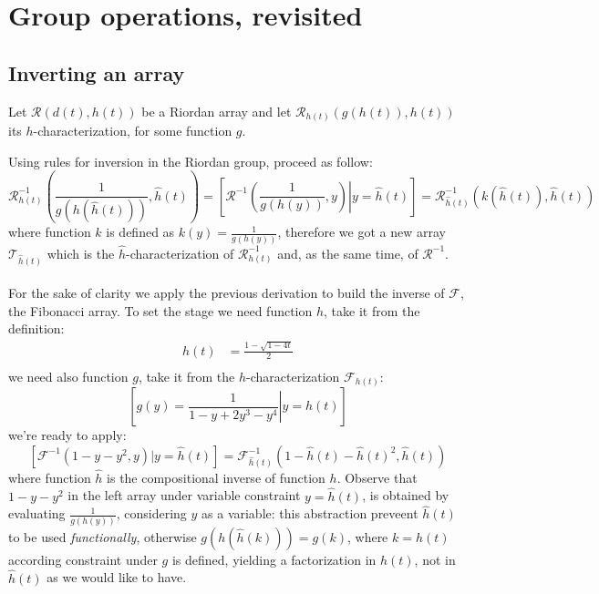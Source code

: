 

\section{Group operations, revisited}

\subsection{Inverting an array}

Let $\mathcal{R}\left(d(t),h(t)\right)$ be a Riordan array and let 
$\mathcal{R}_{h(t)}\left(g(h(t)),h(t)\right)$ its $h$-characterization, for some
function $g$. %
 
Using rules for inversion in the Riordan group, 
proceed as follow:
\begin{displaymath}
    \mathcal{R}_{h(t)}^{-1}\left(\frac{1}{g(h(\hat{h}(t)))},\hat{h}(t)\right)=
    \left[\mathcal{R}^{-1}\left(\left.\frac{1}{g(h(y))},y\right) \right| y = \hat{h}(t) \right]=
    \mathcal{R}_{\hat{h}(t)}^{-1}\left(k(\hat{h}(t)),\hat{h}(t)\right)
\end{displaymath}
where function $k$ is defined as $k(y)=\frac{1}{g(h(y))}$, 
therefore we got a new array $\mathcal{T}_{\hat{h}(t)}$ which is the $\hat{h}$-characterization
of $\mathcal{R}_{h(t)}^{-1}$ and, as the same time, of $\mathcal{R}^{-1}$.
\\\\
For the sake of clarity we apply the previous derivation to build the inverse of $\mathcal{F}$,
the Fibonacci array.  To set the stage we need function $h$, take it from the definition:
\begin{displaymath}
    \begin{split}
        h(t)&=\frac{1-\sqrt{1-4t}}{2}\\
    \end{split}
\end{displaymath}
we need also function $g$, take it from the $h$-characterization $\mathcal{F}_{h(t)}$:
\begin{displaymath}
    \left[g(y)=\left.\frac{1}{1-y+2y^3-y^4} \right| y=h(t)\right]
\end{displaymath}
we're ready to apply:
\begin{displaymath}
    \left[\mathcal{F}^{-1}\left(1-y-y^2,y\right) | y = \hat{h}(t) \right]=
    \mathcal{F}_{\hat{h}(t)}^{-1}\left(1-\hat{h}(t)-\hat{h}(t)^2,\hat{h}(t)\right)
\end{displaymath}
where function $\hat{h}$ is the compositional inverse of function $h$. Observe that
$1-y-y^2$ in the left array under variable constraint $y=\hat{h}(t)$, is obtained by
evaluating $\frac{1}{g(h(y))}$, considering $y$ as a variable: this abstraction preveent 
$\hat{h}(t)$ to be used \emph{functionally}, otherwise $g(h(\hat{h}(k)))=g(k)$, where $k=h(t)$
according constraint under $g$ is defined, yielding a factorization in $h(t)$, not in $\hat{h}(t)$
as we would like to have.

